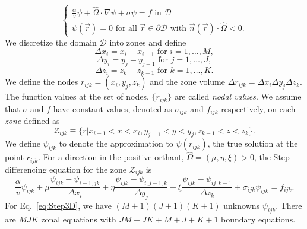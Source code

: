 \begin{equation}
\begin{cases}
	\frac{\alpha}{v} \psi + \hat{\Omega} \cdot \nabla \psi + \sigma \psi = f \text{ in } \mathcal{D} \\
	\psi(\vec{r}) = 0 \text{ for all } \vec{r} \in \partial \mathcal{D} \text { with } \vec{n}(\vec{r}) \cdot \hat{\Omega} < 0.
\end{cases}
\label{eq:ContG}
\end{equation}
We discretize the domain $\mathcal{D}$ into zones and define
\begin{equation}
	\Delta x_{i} = x_{i} - x_{i-1} \text{ for } i = 1, \dots, M,
\end{equation}
\begin{equation}
	\Delta y_{i} = y_{j} - y_{j-1} \text{ for } j = 1, \dots, J,
\end{equation}
\begin{equation}
	\Delta z_{i} = z_{k} - z_{k-1} \text{ for } k = 1, \dots, K.
\end{equation}
We define the nodes $r_{ijk} = (x_{i}, y_{j}, z_{k})$ and the zone volume $\Delta r_{ijk} = \Delta x_{i} \Delta y_{j} \Delta z_{k}$. The function values at the set of nodes, $\{r_{ijk}\}$ are called \textit{nodal values}. We assume that $\sigma$ and $f$ have constant values, denoted as $\sigma_{ijk}$ and $f_{ijk}$ respectively, on each \textit{zone} defined as
\begin{equation}
	\mathcal{Z}_{ijk} \equiv \{ r \vert x_{i-1} < x < x_{i}, y_{j-1} < y < y_{j}, z_{k-1} < z < z_{k} \}.
\end{equation}
We define $\psi_{ijk}$ to denote the approximation to $\psi(r_{ijk})$, the true solution at the point $r_{ijk}$. For a direction in the positive orthant, $\hat{\Omega} = (\mu, \eta, \xi) > 0$, the Step differencing equation for the zone $\mathcal{Z}_{ijk}$ is
\begin{equation}
	\frac{\alpha}{v} \psi_{ijk} + \mu \frac{\psi_{ijk} - \psi_{i-1,jk}}{\Delta x_{i}} + \eta \frac{\psi_{ijk} - \psi_{i,j-1,k}}{\Delta y_{j}} + \xi \frac{\psi_{ijk} - \psi_{ij,k-1}}{\Delta z_{k}} + \sigma_{ijk} \psi_{ijk} = f_{ijk}.
	\label{eq:Step3D}
\end{equation}
For Eq.~\ref{eq:Step3D}, we have $(M+1)(J+1)(K+1)$ unknowns $\psi_{ijk}$. There are $MJK$ zonal equations with $JM + JK + M + J + K + 1$ boundary equations.

